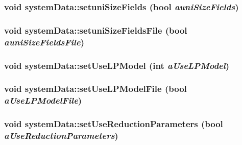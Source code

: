 \hypertarget{classsystem_data_ae26b38e7c80e00428d7af0802588a9d6}{
\subsubsection[{setuniSizeFields}]{\setlength{\rightskip}{0pt plus 5cm}void systemData::setuniSizeFields (bool {\em auniSizeFields})}}
\label{classsystem_data_ae26b38e7c80e00428d7af0802588a9d6}
\hypertarget{classsystem_data_aee44dc82abe589959b8475a3a80ac608}{
\subsubsection[{setuniSizeFieldsFile}]{\setlength{\rightskip}{0pt plus 5cm}void systemData::setuniSizeFieldsFile (bool {\em auniSizeFieldsFile})}}
\label{classsystem_data_aee44dc82abe589959b8475a3a80ac608}
\hypertarget{classsystem_data_ac2e3bf3779ffd084cf48e59d38e0726b}{
\subsubsection[{setUseLPModel}]{\setlength{\rightskip}{0pt plus 5cm}void systemData::setUseLPModel (int {\em aUseLPModel})}}
\label{classsystem_data_ac2e3bf3779ffd084cf48e59d38e0726b}
\hypertarget{classsystem_data_aa2b9489e4dc0796ac0edb2abdcc99bed}{
\subsubsection[{setUseLPModelFile}]{\setlength{\rightskip}{0pt plus 5cm}void systemData::setUseLPModelFile (bool {\em aUseLPModelFile})}}
\label{classsystem_data_aa2b9489e4dc0796ac0edb2abdcc99bed}
\hypertarget{classsystem_data_ab0311529bdd84d8662d3b9b6de4a95da}{
\subsubsection[{setUseReductionParameters}]{\setlength{\rightskip}{0pt plus 5cm}void systemData::setUseReductionParameters (bool {\em aUseReductionParameters})}}
